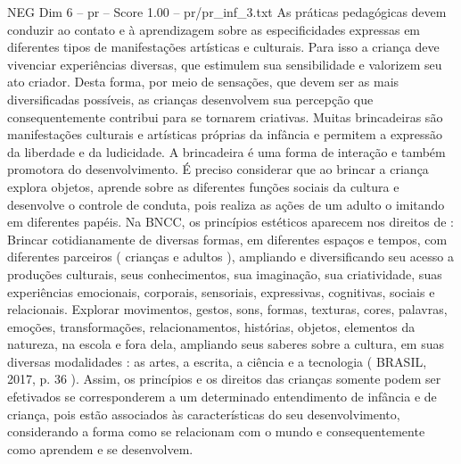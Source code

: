 \begin{textsample}{NEG Dim 6 – pr – Score 1.00 – pr/pr\_inf\_3.txt}
As práticas pedagógicas devem conduzir ao contato e à aprendizagem sobre as especificidades expressas em diferentes tipos de manifestações artísticas e culturais.
Para isso a criança deve vivenciar experiências diversas, que estimulem sua sensibilidade e valorizem seu ato criador.
Desta forma, por meio de sensações, que devem ser as mais diversificadas possíveis, as crianças desenvolvem sua percepção que consequentemente contribui para se tornarem criativas.
Muitas brincadeiras são manifestações culturais e artísticas próprias da infância e permitem a expressão da liberdade e da ludicidade.
A brincadeira é uma forma de interação e também promotora do desenvolvimento.
É preciso considerar que ao brincar a criança explora objetos, aprende sobre as diferentes funções sociais da cultura e desenvolve o controle de conduta, pois realiza as ações de um adulto o imitando em diferentes papéis.
Na BNCC, os princípios estéticos aparecem nos direitos de : Brincar cotidianamente de diversas formas, em diferentes espaços e tempos, com diferentes parceiros ( crianças e adultos ), ampliando e diversificando seu acesso a produções culturais, seus conhecimentos, sua imaginação, sua criatividade, suas experiências emocionais, corporais, sensoriais, expressivas, cognitivas, sociais e relacionais.
Explorar movimentos, gestos, sons, formas, texturas, cores, palavras, emoções, transformações, relacionamentos, histórias, objetos, elementos da natureza, na escola e fora dela, ampliando seus saberes sobre a cultura, em suas diversas modalidades : as artes, a escrita, a ciência e a tecnologia ( BRASIL, 2017, p. 36 ).
Assim, os princípios e os direitos das crianças somente podem ser efetivados se corresponderem a um determinado entendimento de infância e de criança, pois estão associados às características do seu desenvolvimento, considerando a forma como se relacionam com o mundo e consequentemente como aprendem e se desenvolvem.

\end{textsample}
